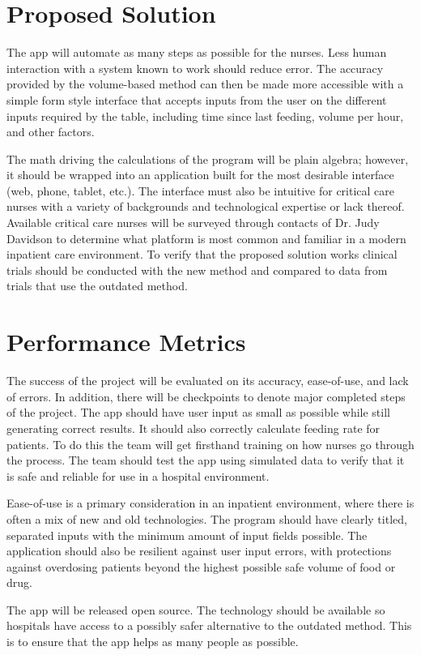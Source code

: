 \documentclass[fullpage,10pt, onecolumn, draftclsnofoot]{IEEEtran}
\begin{document}
\section{Proposed Solution}
The app will automate as many steps as possible for the nurses. Less human 
 interaction with a system known to work should reduce error. 
The accuracy provided by the volume-based method can then be made more accessible with 
a simple form style interface that accepts inputs from the user on the different inputs required
by the table, including time since last feeding, volume per hour, and other factors.

The math driving the calculations of the program will be plain algebra; however, it should be wrapped into an application built
for the most desirable interface (web, phone, tablet, etc.). The interface must also be intuitive for
critical care nurses with a variety of backgrounds and technological expertise or lack thereof.
Available
critical care nurses will be surveyed through contacts of Dr. Judy Davidson to determine what 
platform is most common and familiar in a modern inpatient care environment.
To verify that the proposed solution
works clinical trials should be conducted with the new method and compared to data from trials 
that use the outdated method.

\section{Performance Metrics}
The success of the project will be evaluated on its accuracy, ease-of-use, and lack of errors.
In addition, there will be checkpoints to denote major completed steps of the project.
The app should have user input as small as possible while still generating correct results.
It should also correctly calculate feeding rate for patients. To do this the team will get firsthand 
training on how nurses go through the process. The team should test the app using simulated data 
to verify that it is safe and reliable for use in a hospital environment. 

Ease-of-use is a primary consideration in an inpatient environment, where there is often a mix of new and old technologies.
The program should have clearly titled, separated inputs with the minimum amount of input fields
possible. The application should also
be resilient against user input errors, with protections against overdosing patients beyond the
highest possible safe volume of food or drug.

The app will be released open source. The technology should be available so hospitals
have access to a possibly safer alternative to the outdated method. This is to ensure that the app
helps as many people as possible. 
\end{document}
